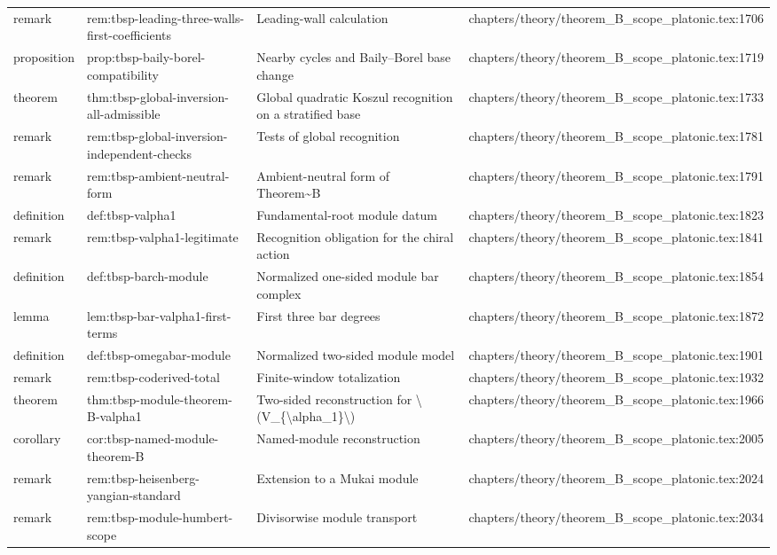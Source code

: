 \documentclass[11pt]{article}
\begin{document}
\begin{longtable}{L{0.10\textwidth}L{0.26\textwidth}L{0.42\textwidth}L{0.22\textwidth}}
remark & rem:tbsp-leading-three-walls-first-coefficients & Leading-wall calculation & chapters/theory/theorem\_B\_scope\_platonic.tex:1706\\
proposition & prop:tbsp-baily-borel-compatibility & Nearby cycles and Baily--Borel base change & chapters/theory/theorem\_B\_scope\_platonic.tex:1719\\
theorem & thm:tbsp-global-inversion-all-admissible & Global quadratic Koszul recognition on a stratified base & chapters/theory/theorem\_B\_scope\_platonic.tex:1733\\
remark & rem:tbsp-global-inversion-independent-checks & Tests of global recognition & chapters/theory/theorem\_B\_scope\_platonic.tex:1781\\
remark & rem:tbsp-ambient-neutral-form & Ambient-neutral form of Theorem\textasciitilde{}B & chapters/theory/theorem\_B\_scope\_platonic.tex:1791\\
definition & def:tbsp-valpha1 & Fundamental-root module datum & chapters/theory/theorem\_B\_scope\_platonic.tex:1823\\
remark & rem:tbsp-valpha1-legitimate & Recognition obligation for the chiral action & chapters/theory/theorem\_B\_scope\_platonic.tex:1841\\
definition & def:tbsp-barch-module & Normalized one-sided module bar complex & chapters/theory/theorem\_B\_scope\_platonic.tex:1854\\
lemma & lem:tbsp-bar-valpha1-first-terms & First three bar degrees & chapters/theory/theorem\_B\_scope\_platonic.tex:1872\\
definition & def:tbsp-omegabar-module & Normalized two-sided module model & chapters/theory/theorem\_B\_scope\_platonic.tex:1901\\
remark & rem:tbsp-coderived-total & Finite-window totalization & chapters/theory/theorem\_B\_scope\_platonic.tex:1932\\
theorem & thm:tbsp-module-theorem-B-valpha1 & Two-sided reconstruction for \textbackslash{}(V\_\{\textbackslash{}alpha\_1\}\textbackslash{}) & chapters/theory/theorem\_B\_scope\_platonic.tex:1966\\
corollary & cor:tbsp-named-module-theorem-B & Named-module reconstruction & chapters/theory/theorem\_B\_scope\_platonic.tex:2005\\
remark & rem:tbsp-heisenberg-yangian-standard & Extension to a Mukai module & chapters/theory/theorem\_B\_scope\_platonic.tex:2024\\
remark & rem:tbsp-module-humbert-scope & Divisorwise module transport & chapters/theory/theorem\_B\_scope\_platonic.tex:2034\\

\end{longtable}
\end{document}
